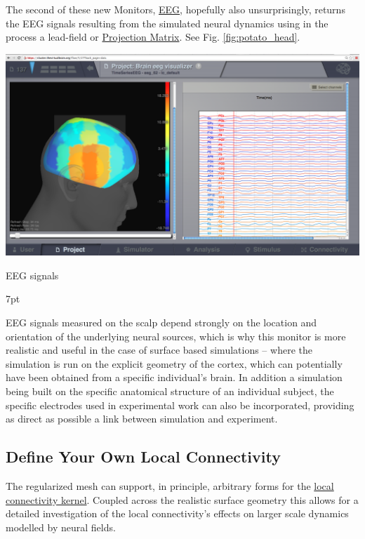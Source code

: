 \documentclass{tufte-handout}
\newenvironment{blah}{%
  \def\FrameCommand{%
    \hspace{1pt}%
    {\color{DarkOrange}\vrule width 2pt}%
    {\color{PeachPuff}\vrule width 4pt}%
    \colorbox{PeachPuff}%
  }%
  \MakeFramed{\advance\hsize-\width\FrameRestore}%
  \noindent\hspace{-4.55pt}%
  \begin{adjustwidth}{}{7pt}%
  \vspace{2pt}\vspace{2pt}%
}
{%
  \vspace{2pt}\end{adjustwidth}\endMakeFramed%
}
\begin{document}
The second of these new Monitors, \underline{EEG}, hopefully also
unsurprisingly, returns the EEG signals resulting from the simulated neural
dynamics using in the process a lead-field or \underline{Projection Matrix}.  See Fig. \ref{fig:potato_head}.
\begin{marginfigure}
  \includegraphics[width=\linewidth]{Handout_UI_BuildingYourOwnBrainNetworkModel_DefaultLocalConnectivityPotatoHead}%
  \caption{EEG signals}%
  \label{fig:potato_head}%
\end{marginfigure}

\begin{blah}
EEG signals measured on the scalp depend strongly on the location
and orientation of the underlying neural sources, which is why this monitor is
more realistic and useful in the case of surface based simulations -- where
the simulation is run on the explicit geometry of the cortex, which can
potentially have been obtained from a specific individual's brain. 
In addition a simulation being built on the specific anatomical structure of an individual
subject, the specific electrodes used in experimental work can also be
incorporated, providing as direct as possible a link between simulation and
experiment. 
\end{blah}

\subsection{Define Your Own Local Connectivity}\label{sec:local_connectivity}

The regularized mesh can support, in principle, arbitrary forms for the
\underline{local connectivity kernel}. Coupled across the realistic surface geometry this
allows for a detailed investigation of the local connectivity's effects on
larger scale dynamics modelled by neural fields.
\end{document}
